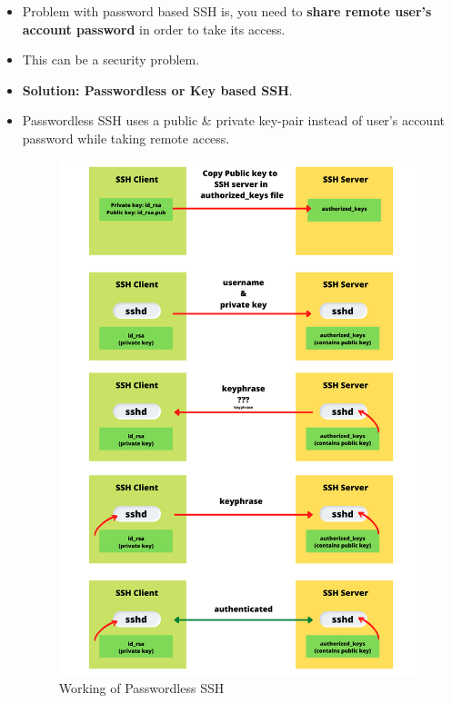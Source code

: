 \setlength{\columnsep}{3pt}
\begin{flushleft}

\bigskip
\begin{itemize}
	\item Problem with password based SSH is, you need to \textbf{share remote user's account password} in order to take its access.
	\item This can be a security problem.
	\item \textbf{Solution: Passwordless or Key based SSH}.
	\item Passwordless SSH uses a public \& private key-pair instead of user's account password while taking remote access.
	\begin{figure}[h!]
		\centering
		\includegraphics[scale=0.25]{content/chapter19/images/final.png}
		\caption{Working of Passwordless SSH}
		\label{fig:stage55635}
	\end{figure}
	

\end{itemize}
\end{flushleft}
